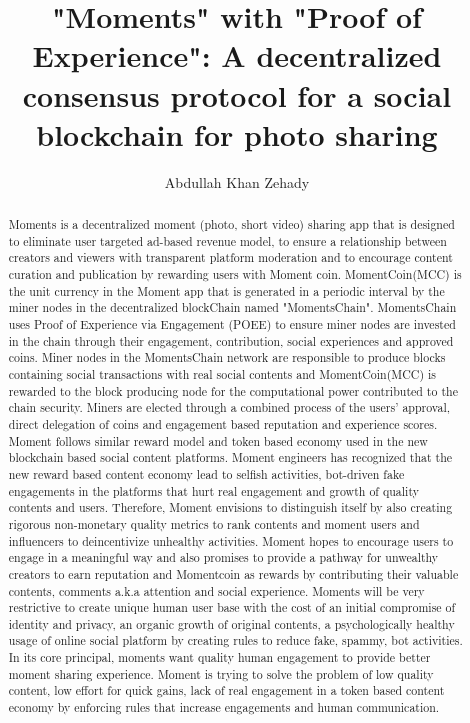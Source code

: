 \documentclass[a4paper]{article}
\title{"Moments" with "Proof of Experience": A decentralized consensus protocol for a social blockchain for photo sharing }
\author{Abdullah Khan Zehady}
\begin{document}
\maketitle

\begin{abstract}
Moments is a decentralized moment (photo, short video) sharing app that is designed to eliminate user targeted ad-based revenue model, to ensure a relationship between creators and viewers with transparent platform moderation and to encourage content curation and publication by rewarding users with Moment coin. MomentCoin(MCC) is the unit currency in the Moment app that is generated in a periodic interval by the miner nodes in the decentralized blockChain named "MomentsChain". MomentsChain uses Proof of Experience via Engagement (POEE) to ensure miner nodes are invested in the chain through their engagement, contribution, social experiences and approved coins. Miner nodes in the MomentsChain network are responsible to produce blocks containing social transactions with real social contents and MomentCoin(MCC) is rewarded to the block producing node for the computational power contributed to the chain security. Miners are elected through a combined process of the users' approval, direct delegation of coins and engagement based reputation and experience scores. Moment follows similar reward model and token based economy used in the new blockchain based social content platforms. Moment engineers has recognized that the new reward based content economy lead to selfish activities, bot-driven fake engagements in the platforms that hurt real engagement and growth of quality contents and users. Therefore, Moment envisions to distinguish itself by also creating rigorous non-monetary quality metrics to rank contents and moment users and influencers to deincentivize unhealthy activities. Moment hopes to encourage users to engage in a meaningful way and also promises to provide a pathway for unwealthy creators to earn reputation and Momentcoin as rewards by contributing their valuable contents, comments a.k.a attention and social experience. Moments will be very restrictive to create unique human user base with the cost of an initial compromise of identity and privacy, an organic growth of original contents, a psychologically healthy usage of online social platform by creating rules to reduce fake, spammy, bot activities. In its core principal, moments want quality human engagement to provide better moment sharing experience. Moment is trying to solve the problem of low quality content, low effort for quick gains, lack of real engagement in a token based content economy by enforcing rules that increase engagements and human communication.

\end{abstract}
\end{document}
